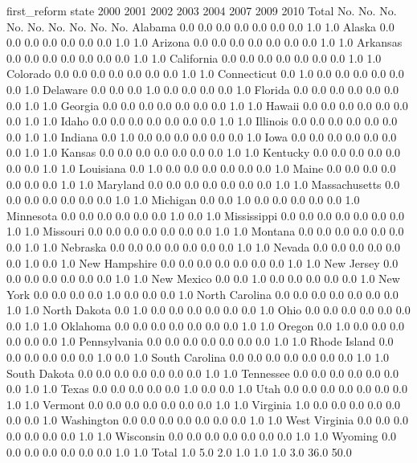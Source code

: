 	first_reform								
state	2000	2001	2002	2003	2004	2007	2009	2010	Total
	No.	No.	No.	No.	No.	No.	No.	No.	No.
Alabama	0.0	0.0	0.0	0.0	0.0	0.0	0.0	1.0	1.0
Alaska	0.0	0.0	0.0	0.0	0.0	0.0	0.0	1.0	1.0
Arizona	0.0	0.0	0.0	0.0	0.0	0.0	0.0	1.0	1.0
Arkansas	0.0	0.0	0.0	0.0	0.0	0.0	0.0	1.0	1.0
California	0.0	0.0	0.0	0.0	0.0	0.0	0.0	1.0	1.0
Colorado	0.0	0.0	0.0	0.0	0.0	0.0	0.0	1.0	1.0
Connecticut	0.0	1.0	0.0	0.0	0.0	0.0	0.0	0.0	1.0
Delaware	0.0	0.0	0.0	1.0	0.0	0.0	0.0	0.0	1.0
Florida	0.0	0.0	0.0	0.0	0.0	0.0	0.0	1.0	1.0
Georgia	0.0	0.0	0.0	0.0	0.0	0.0	0.0	1.0	1.0
Hawaii	0.0	0.0	0.0	0.0	0.0	0.0	0.0	1.0	1.0
Idaho	0.0	0.0	0.0	0.0	0.0	0.0	0.0	1.0	1.0
Illinois	0.0	0.0	0.0	0.0	0.0	0.0	0.0	1.0	1.0
Indiana	0.0	1.0	0.0	0.0	0.0	0.0	0.0	0.0	1.0
Iowa	0.0	0.0	0.0	0.0	0.0	0.0	0.0	1.0	1.0
Kansas	0.0	0.0	0.0	0.0	0.0	0.0	0.0	1.0	1.0
Kentucky	0.0	0.0	0.0	0.0	0.0	0.0	0.0	1.0	1.0
Louisiana	0.0	1.0	0.0	0.0	0.0	0.0	0.0	0.0	1.0
Maine	0.0	0.0	0.0	0.0	0.0	0.0	0.0	1.0	1.0
Maryland	0.0	0.0	0.0	0.0	0.0	0.0	0.0	1.0	1.0
Massachusetts	0.0	0.0	0.0	0.0	0.0	0.0	0.0	1.0	1.0
Michigan	0.0	0.0	1.0	0.0	0.0	0.0	0.0	0.0	1.0
Minnesota	0.0	0.0	0.0	0.0	0.0	0.0	1.0	0.0	1.0
Mississippi	0.0	0.0	0.0	0.0	0.0	0.0	0.0	1.0	1.0
Missouri	0.0	0.0	0.0	0.0	0.0	0.0	0.0	1.0	1.0
Montana	0.0	0.0	0.0	0.0	0.0	0.0	0.0	1.0	1.0
Nebraska	0.0	0.0	0.0	0.0	0.0	0.0	0.0	1.0	1.0
Nevada	0.0	0.0	0.0	0.0	0.0	0.0	1.0	0.0	1.0
New Hampshire	0.0	0.0	0.0	0.0	0.0	0.0	0.0	1.0	1.0
New Jersey	0.0	0.0	0.0	0.0	0.0	0.0	0.0	1.0	1.0
New Mexico	0.0	0.0	1.0	0.0	0.0	0.0	0.0	0.0	1.0
New York	0.0	0.0	0.0	0.0	1.0	0.0	0.0	0.0	1.0
North Carolina	0.0	0.0	0.0	0.0	0.0	0.0	0.0	1.0	1.0
North Dakota	0.0	1.0	0.0	0.0	0.0	0.0	0.0	0.0	1.0
Ohio	0.0	0.0	0.0	0.0	0.0	0.0	0.0	1.0	1.0
Oklahoma	0.0	0.0	0.0	0.0	0.0	0.0	0.0	1.0	1.0
Oregon	0.0	1.0	0.0	0.0	0.0	0.0	0.0	0.0	1.0
Pennsylvania	0.0	0.0	0.0	0.0	0.0	0.0	0.0	1.0	1.0
Rhode Island	0.0	0.0	0.0	0.0	0.0	0.0	1.0	0.0	1.0
South Carolina	0.0	0.0	0.0	0.0	0.0	0.0	0.0	1.0	1.0
South Dakota	0.0	0.0	0.0	0.0	0.0	0.0	0.0	1.0	1.0
Tennessee	0.0	0.0	0.0	0.0	0.0	0.0	0.0	1.0	1.0
Texas	0.0	0.0	0.0	0.0	0.0	1.0	0.0	0.0	1.0
Utah	0.0	0.0	0.0	0.0	0.0	0.0	0.0	1.0	1.0
Vermont	0.0	0.0	0.0	0.0	0.0	0.0	0.0	1.0	1.0
Virginia	1.0	0.0	0.0	0.0	0.0	0.0	0.0	0.0	1.0
Washington	0.0	0.0	0.0	0.0	0.0	0.0	0.0	1.0	1.0
West Virginia	0.0	0.0	0.0	0.0	0.0	0.0	0.0	1.0	1.0
Wisconsin	0.0	0.0	0.0	0.0	0.0	0.0	0.0	1.0	1.0
Wyoming	0.0	0.0	0.0	0.0	0.0	0.0	0.0	1.0	1.0
Total	1.0	5.0	2.0	1.0	1.0	1.0	3.0	36.0	50.0

